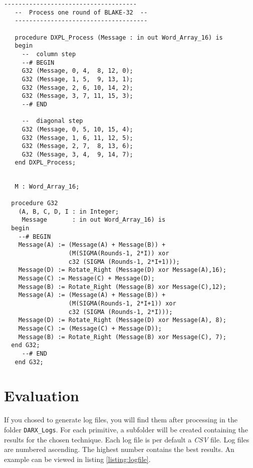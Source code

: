 \documentclass{acmtrans2m}
\begin{document}
\vfill

\begin{lstlisting}[caption={Annotations for analyzation encapsulate the colummn step of BLAKE-32. Please keep in mind, that annotations work only within the defined procedure. Actually, using annotations like this has no effects.},label=listing:annotations]
   -------------------------------------
   --  Process one round of BLAKE-32  --
   -------------------------------------

   procedure DXPL_Process (Message : in out Word_Array_16) is
   begin
     --  column step
     --# BEGIN
     G32 (Message, 0, 4,  8, 12, 0);
     G32 (Message, 1, 5,  9, 13, 1);
     G32 (Message, 2, 6, 10, 14, 2);
     G32 (Message, 3, 7, 11, 15, 3);    
     --# END

     --  diagonal step
     G32 (Message, 0, 5, 10, 15, 4);
     G32 (Message, 1, 6, 11, 12, 5);
     G32 (Message, 2, 7,  8, 13, 6);
     G32 (Message, 3, 4,  9, 14, 7);
   end DXPL_Process;
\end{lstlisting}


\begin{lstlisting}[caption={Correct usage of annotations to analyze a global procedure. Minor drawback is, that you cannot analyze the column steps without analyzing the diagonal steps, too.},label=listing:annotations2]

   M : Word_Array_16;

  procedure G32
    (A, B, C, D, I : in Integer;
     Message       : in out Word_Array_16) is
  begin
    --# BEGIN
    Message(A) := (Message(A) + Message(B)) + 
                  (M(SIGMA(Rounds-1, 2*I)) xor
                  c32 (SIGMA (Rounds-1, 2*I+1)));
    Message(D) := Rotate_Right (Message(D) xor Message(A),16);
    Message(C) := Message(C) + Message(D);
    Message(B) := Rotate_Right (Message(B) xor Message(C),12);
    Message(A) := (Message(A) + Message(B)) +
                  (M(SIGMA(Rounds-1, 2*I+1)) xor
                  c32 (SIGMA (Rounds-1, 2*I)));
    Message(D) := Rotate_Right (Message(D) xor Message(A), 8);
    Message(C) := (Message(C) + Message(D));
    Message(B) := Rotate_Right (Message(B) xor Message(C), 7);
  end G32;
     --# END
   end G32;
\end{lstlisting}

\section{Evaluation}
If you chosed to generate log files, you will find them after processing in the
folder \texttt{DARX\_Logs}. For each primitive, a subfolder will be created containing
the results for the chosen technique. Each log file is per default a \textit{CSV} file. 
Log files are numbered ascending. The highest number contains the best results.
An example can be viewed in listing \ref{listing:logfile}.
\end{document}
